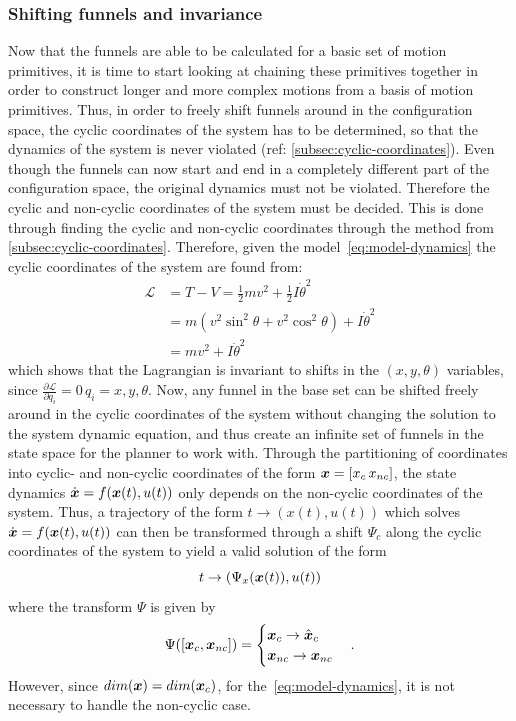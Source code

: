 \subsubsection{Shifting funnels and invariance}
\label{subsec:shifting-funnels}

Now that the funnels are able to be calculated for a basic set of motion
primitives, it is time to start looking at chaining these primitives together in
order to construct longer and more complex motions from a basis of motion
primitives. Thus, in order to freely shift funnels around in the configuration
space, the cyclic coordinates of the system has to be determined, so that the
dynamics of the system is never violated (ref:
\cref{subsec:cyclic-coordinates}). Even though the funnels can now start and end
in a completely different part of the configuration space, the original dynamics
must not be violated. Therefore the cyclic and non-cyclic coordinates of the
system must be decided. This is done through finding the cyclic and non-cyclic
coordinates through the method from \cref{subsec:cyclic-coordinates}. Therefore,
given the model~\cref{eq:model-dynamics} the cyclic coordinates of the system
are found from:
\begin{align*}
  \mathcal{L} &= T - V = \frac{1}{2} mv^2 + \frac{1}{2}I\dot{\theta}^2 \\ 
              &= m \left(
                v^2 \sin^2 \theta + v^2 \cos^2 \theta
                \right)  + I {\dot{\theta}}^2 \\
              &= mv^2 + I {\dot{\theta}}^2
\end{align*}
which shows that the Lagrangian is invariant to shifts in the \((x,y,\theta)\)
variables, since \(\frac{\partial\mathcal{L}}{\partial q_i} = 0 \, q_i =
x,y,\theta\). Now, any funnel in the base set can be shifted freely around in
the cyclic coordinates of the system without changing the solution to the system
dynamic equation, and thus create an infinite set of funnels in the state space
for the planner to work with. Through the partitioning of coordinates into
cyclic- and non-cyclic coordinates of the form \(\boldsymbol{x} = [x_c\, x_{nc}]\),
the state dynamics \(\dot{\boldsymbol{x}} = f(\boldsymbol{x} (t), u(t))\) only depends on
the non-cyclic coordinates of the system. Thus, a trajectory of the form \(t
\rightarrow (x(t),u(t))\) which solves \(\dot{\boldsymbol{x}} = f(\boldsymbol{x}(t),u(t))\)
can then be transformed through a shift \(\Psi_c\) along the cyclic coordinates
of the system to yield a valid solution of the form
\[
  t \rightarrow (\Psi_{x}(\boldsymbol{x}(t)), u(t))
\]
where the transform \(\Psi\) is given by
\[
  \Psi([\boldsymbol{x}_c, \boldsymbol{x}_{nc}]) =
  \begin{cases}
    \boldsymbol{x}_c \rightarrow \hat{\boldsymbol{x}}_{c} \\
    \boldsymbol{x}_{nc} \rightarrow \boldsymbol{x}_{nc} \\
  \end{cases}.
\]
However, since \(\mathnormal{dim}(\boldsymbol{x}) = \mathnormal{dim}(\boldsymbol{x}_c) \),
for the~\cref{eq:model-dynamics}, it is not necessary to handle the non-cyclic
case.

